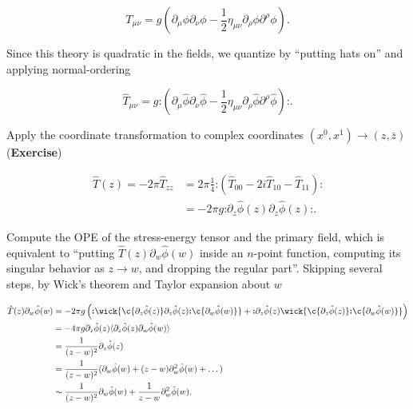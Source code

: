 \begin{equation}
T_{\mu\nu} = g ( \partial_\mu \phi \partial_\nu \phi - \frac{1}{2} \eta_{\mu\nu} \partial_\rho \phi \partial^\rho \phi ).
\end{equation}

\noindent Since this theory is quadratic in the fields, we quantize by ``putting hats on'' and applying normal-ordering

\begin{equation}
\hat{T}_{\mu\nu} = g \textbf{:} ( \partial_\mu \hat{\phi} \partial_\nu \hat{\phi} - \frac{1}{2} \eta_{\mu\nu} \partial_\rho \hat{\phi} \partial^\rho \hat{\phi} ) \textbf{:} .
\end{equation}

\noindent Apply the coordinate transformation to complex coordinates $(x^0, x^1) \rightarrow (z, \bar{z})$ (\textbf{Exercise})

\begin{align}
\hat{T} (z) = -2 \pi \hat{T}_{zz} &= 2\pi \frac{1}{4} \textbf{:} (\hat{T}_{00} - 2i \hat{T}_{10} - \hat{T}_{11}) \textbf{:} \\
&= -2\pi g \textbf{:} \partial_z \hat{\phi} (z)  \partial_z \hat{\phi} (z)  \textbf{:}.
\end{align}

\noindent Compute the OPE of the stress-energy tensor and the primary field, which is equivalent to ``putting $\hat{T} (z) \partial_w \hat{\phi} (w)$ inside an $n$-point function, computing its singular behavior as $z \rightarrow w$, and dropping the regular part''. Skipping several steps, by Wick's theorem and Taylor expansion about $w$

\begin{align}
\hat{T} (z) \partial_w \hat{\phi} (w) &= -2\pi g \left( \textbf{:} \wick{ \c {\partial_z \hat{\phi} (z)} \partial_z \hat{\phi} (z) \textbf{:} \c{ \partial_w \hat{\phi} (w) }} + \textbf{:} \partial_z \hat{\phi} (z) \wick{ \c {\partial_z \hat{\phi} (z)} \textbf{:} \c {\partial_w \hat{\phi} (w)}} \right) \\
&= -4\pi g \partial_z \hat{\phi} (z) \langle \partial_z \hat{\phi} (z) \partial_w \hat{\phi} (w) \rangle \\
&= \frac{1}{(z-w)^2} \partial_z \hat{\phi} (z) \\
&= \frac{1}{(z-w)^2} (\partial_w \hat{\phi} (w) + (z-w) \partial_w^2 \hat{\phi} (w) + \dots ) \\
&\sim \frac{1}{(z-w)^2} \partial_w \hat{\phi} (w) + \frac{1}{z-w} \partial_w^2 \hat{\phi} (w).
\end{align}


